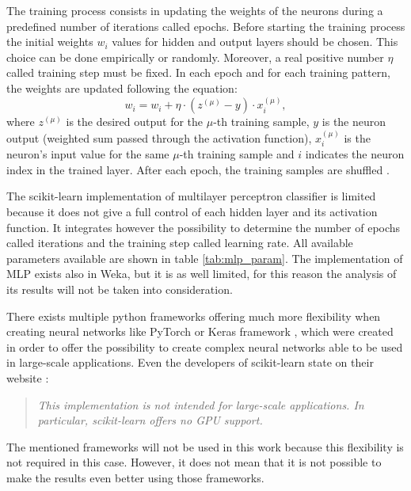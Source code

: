 The training process consists in updating the weights of the neurons during a predefined number of iterations called epochs. Before starting the training process the initial weights $w_i$ values for hidden and output layers should be chosen. This choice can be done empirically or randomly. Moreover, a real positive number $\eta$ called training step must be fixed. In each epoch and for each training pattern, the weights are updated following the equation:
\begin{equation}
    w_i = w_i + \eta\cdot (z^{(\mu)}-y) \cdot x_i^{(\mu)},
\end{equation}
where $z^{(\mu)}$ is the desired output for the $\mu$-th training sample, $y$ is the neuron output (weighted sum passed through the activation function), $x_i^{(\mu)}$ is the neuron's input value for the same $\mu$-th training sample and $i$ indicates the neuron index in the trained layer. After each epoch, the training samples are shuffled \cite{stokfiszewski_soft_nodate}. 

The scikit-learn implementation of multilayer perceptron classifier is limited because it does not give a full control of each hidden layer and its activation function. It integrates however the possibility to determine the number of epochs called iterations and the training step called learning rate. All available parameters available are shown in table \ref{tab:mlp_param}. The implementation of MLP exists also in Weka, but it is as well limited, for this reason the analysis of its results will not be taken into consideration.

There exists multiple python frameworks offering much more flexibility when creating neural networks like PyTorch \cite{noauthor_pytorch_nodate} or Keras framework \cite{noauthor_keras_nodate}, which were created in order to offer the possibility to create complex neural networks able to be used in large-scale applications. Even the developers of scikit-learn state on their website \cite{noauthor_neural_nodate}:

\begin{quote}
    \textit{This implementation is not intended for large-scale applications. In particular, \mbox{scikit-learn} offers no GPU support.} 
\end{quote}

The mentioned frameworks will not be used in this work because this flexibility is not required in this case. However, it does not mean that it is not possible to make the results even better using those frameworks.

